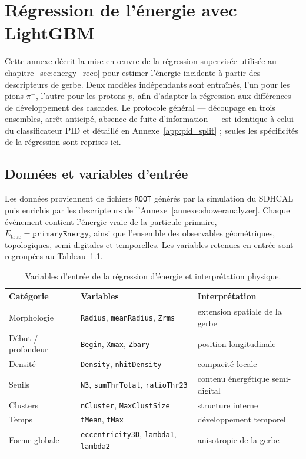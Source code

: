 \chapter{Régression de l'énergie avec LightGBM}
\label{app:energy_lgbm}

Cette annexe décrit la mise en œuvre de la régression supervisée utilisée au
chapitre~\ref{sec:energy_reco} pour estimer l'énergie incidente à partir des descripteurs de gerbe.
Deux modèles indépendants sont entraînés, l'un pour les pions \(\pi^-\), l'autre pour les protons
\(p\), afin d'adapter la régression aux différences de développement des cascades. Le protocole
général — découpage en trois ensembles, arrêt anticipé, absence de fuite d'information — est
identique à celui du classificateur PID et détaillé en Annexe~\ref{app:pid_split} ; seules les
spécificités de la régression sont reprises ici.

\section{Données et variables d'entrée}

Les données proviennent de fichiers \texttt{ROOT} générés par la simulation du SDHCAL puis enrichis par les descripteurs de l'Annexe~\ref{annexe:showeranalyzer}. Chaque événement contient l'énergie vraie de la particule primaire, \(E_{\mathrm{true}} = \texttt{primaryEnergy}\), ainsi que l'ensemble des observables géométriques, topologiques, semi-digitales et temporelles. Les variables retenues en entrée sont regroupées au Tableau~\ref{tab:energy-vars}.

\begin{table}[!ht]
    \centering
    \caption{Variables d'entrée de la régression d'énergie et interprétation physique.}
    \label{tab:energy-vars}
    \small
    \begin{tabularx}{\textwidth}{@{}l l X@{}}
        \toprule
        \textbf{Catégorie} & \textbf{Variables} & \textbf{Interprétation} \\
        \midrule
        Morphologie & \texttt{Radius}, \texttt{meanRadius}, \texttt{Zrms} & extension spatiale de la gerbe \\
        Début / profondeur & \texttt{Begin}, \texttt{Xmax}, \texttt{Zbary} & position longitudinale \\
        Densité & \texttt{Density}, \texttt{nhitDensity} & compacité locale \\
        Seuils & \texttt{N3}, \texttt{sumThrTotal}, \texttt{ratioThr23} & contenu énergétique semi-digital \\
        Clusters & \texttt{nCluster}, \texttt{MaxClustSize} & structure interne \\
        Temps & \texttt{tMean}, \texttt{tMax} & développement temporel \\
        Forme globale & \texttt{eccentricity3D}, \texttt{lambda1}, \texttt{lambda2} & anisotropie de la gerbe \\
        \bottomrule
    \end{tabularx}
\end{table}

